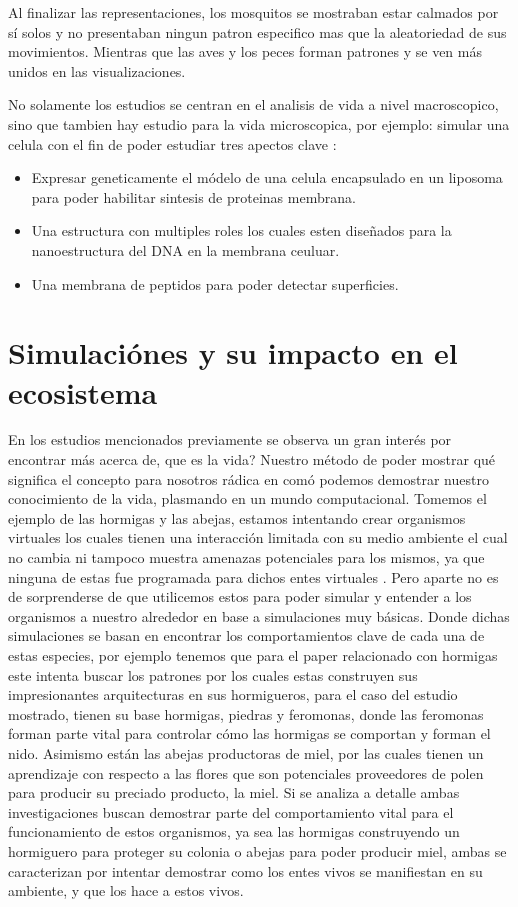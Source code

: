 \documentclass[conference]{IEEEtran}
\begin{document}
Al finalizar las representaciones, los mosquitos se mostraban estar calmados por s\'i solos y no presentaban ningun patron especifico mas que la aleatoriedad de sus movimientos. Mientras que las aves y los peces forman patrones y se ven m\'as unidos en las visualizaciones. \cite{ASTK01}

No solamente los estudios se centran en el analisis de vida a nivel macroscopico, sino que tambien hay estudio para la vida microscopica, por ejemplo: simular una celula con el fin de poder estudiar tres apectos clave
\cite{shinji01} :
\begin{itemize}
\item Expresar geneticamente el m\'odelo de una celula encapsulado en un liposoma para poder habilitar sintesis de proteinas membrana. 
\item Una estructura con multiples roles los cuales esten dise\~nados para la nanoestructura del DNA en la membrana ceuluar. 
\item Una membrana de peptidos para poder detectar superficies.
\end{itemize}


\section{Simulaci\'ones y su impacto en el ecosistema}


En los estudios mencionados previamente se observa un gran inter\'es por encontrar m\'as acerca de, que es la vida? Nuestro m\'etodo de poder mostrar qu\'e significa el concepto para nosotros r\'adica en com\'o podemos demostrar nuestro conocimiento de la vida, plasmando en un mundo computacional. 
Tomemos el ejemplo de las hormigas y las abejas, estamos intentando crear organismos virtuales los cuales tienen una interacci\'on limitada con su medio ambiente el cual no cambia ni tampoco muestra amenazas potenciales para los mismos, ya que ninguna de estas fue programada para dichos entes virtuales \cite{LP01} . Pero aparte no es de sorprenderse de que utilicemos estos para poder simular y entender a los organismos a nuestro alrededor en base a simulaciones muy b\'asicas. Donde dichas simulaciones se basan en encontrar los comportamientos clave de cada una de estas especies, por ejemplo tenemos que para el paper relacionado con hormigas este intenta buscar los patrones por los cuales estas construyen sus impresionantes arquitecturas en sus hormigueros, para el caso del estudio mostrado, tienen su base hormigas, piedras y feromonas, donde las feromonas forman parte vital para controlar c\'omo las hormigas se comportan y forman el nido. 
Asimismo est\'an las abejas productoras de miel, por las cuales tienen un aprendizaje con respecto a las flores que son potenciales proveedores de polen para producir su preciado producto, la miel. 
Si se analiza a detalle ambas investigaciones buscan demostrar parte del comportamiento vital para el funcionamiento de estos organismos, ya sea las hormigas construyendo un hormiguero para proteger su colonia o abejas para poder producir miel, ambas se caracterizan por intentar demostrar como los entes vivos se manifiestan en su ambiente, y que los hace a estos vivos. \cite{ZOE01} \\
\end{document}
